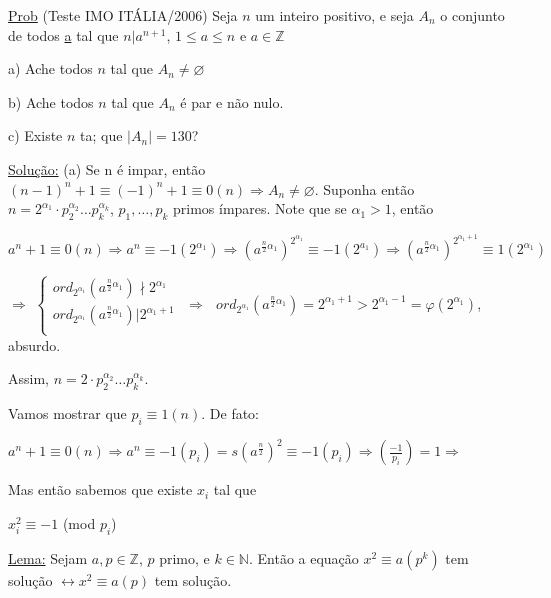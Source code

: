 \documentclass[a4paper,12pt]{article}
\renewcommand{\phi}{\ensuremath{\varphi}}
\renewcommand{\leq}{\ensuremath{\leqslant}}
\theoremstyle{plain} %
\theoremstyle{definition} %
\theoremstyle{remark} %
\begin{document}
	\vspace{1ex}\underline{Prob} (Teste IMO IT\'ALIA/2006) Seja $n$ um inteiro positivo, e seja $A_n$ o conjunto de todos \underline{a} tal que $n|a^{n+1}$, $1\leqslant a\leq n$ e $a\in\mathds{Z}$
	
	a) Ache todos $n$ tal que $A_n\neq\varnothing$
	
	b) Ache todos $n$ tal que $A_n$ \'e par e n\~ao nulo.
	
	c) Existe $n$ ta; que $|A_n|=130$?
	
	\begin{framed}
		\underline{Solu\c{c}\~ao:} (a) Se n \'e impar, ent\~ao $(n-1)^n+1\equiv(-1)^n+1\equiv 0(n)\Rightarrow A_n\neq \varnothing$. Suponha ent\~ao $n=2^{\alpha_1}\cdot p_2^{\alpha_2}\dots p_k^{\alpha_k}$, $p_1, \dotso, p_k$ primos \'impares. Note que se $\alpha_1>1$, ent\~ao
		
		$a^n+1\equiv 0(n)\Rightarrow a^n\equiv -1(2^{\alpha_1})\Rightarrow \left(a^{\frac{n}{2}\alpha_1}\right)^{2^{\alpha_1}}\equiv -1(2^{a_1})\Rightarrow \left(a^{\frac{n}{2}\alpha_1}\right)^{2^{\alpha_1+1}}\equiv 1(2^{\alpha_1})$
		
		$\Rightarrow$ $\left\{
		\begin{array}{lc}
			ord_{2^{\alpha_1}}(a^{\frac{n}{2}\alpha_1})\nmid 2^{\alpha_1}\\
			ord_{2^{\alpha_1}}(a^{\frac{n}{2}\alpha_1})|2^{\alpha_1+1}\\
		\end{array}
		\right.$ $\Rightarrow \text{ } ord_{2^{\alpha_1}}(a^{\frac{n}{2}\alpha_1})=2^{\alpha_1+1}>2^{\alpha_1-1}=\phi (2^{\alpha_1})$, absurdo.
		
		Assim, $n=2\cdot p^{\alpha_2}_2\dotso p^{\alpha_k}_k$.
		
		Vamos mostrar que $p_i\equiv 1(n)$. De fato:
		
		$a^n+1\equiv0(n)\Rightarrow a^n\equiv-1(p_i)=s(a^{\frac{n}{2}})^2\equiv-1(p_i)\Rightarrow \left(\frac{-1}{p_i}\right)=1\Rightarrow$ 
		
		Mas ent\~ao sabemos que existe $x_i$ tal que
		
		\begin{center}
			$x_i^2\equiv-1$ (mod $p_i$)
		\end{center}
		
	\end{framed}
	
	\vspace{2ex}\underline{Lema:} Sejam $a, p\in\mathds{Z}$, $p$ primo, e $k\in\mathds{N}$. Ent\~ao a equa\c{c}\~ao $x^2\equiv a(p^k)$ tem solu\c{c}\~ao $\leftrightarrow x^2\equiv a(p)$ tem solu\c{c}\~ao.
	
\end{document}
